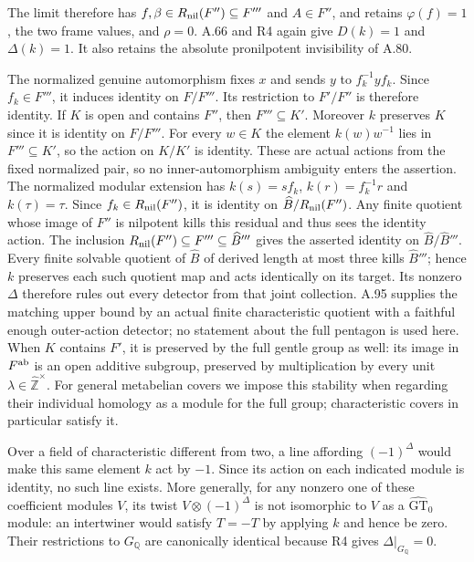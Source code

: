 The limit therefore has $f,\beta\in R_{\rm nil}(F'')\subseteq F'''$
and $A\in F''$, and retains
$\varphi(f)=1$, the two frame values, and $\rho=0$.
A.66 and R4 again give $D(k)=1$ and $\Delta(k)=1$.
It also retains the absolute pronilpotent invisibility of A.80.

The normalized genuine automorphism fixes $x$ and sends
$y$ to $f_k^{-1}yf_k$. Since $f_k\in F'''$, it induces identity
on $F/F'''$. Its restriction to $F'/F''$ is therefore identity.
If $K$ is open and contains $F''$, then $F'''\subseteq K'$.
Moreover $k$ preserves $K$ since it is identity on $F/F'''$.
For every $w\in K$ the element $k(w)w^{-1}$ lies in
$F'''\subseteq K'$, so the action on $K/K'$ is identity.
These are actual actions from the fixed normalized pair, so
no inner-automorphism ambiguity enters the assertion.
The normalized modular extension has
$k(s)=sf_k$, $k(r)=f_k^{-1}r$ and $k(\tau)=\tau$.
Since $f_k\in R_{\rm nil}(F'')$, it is identity on
$\widehat B/R_{\rm nil}(F'')$. Any finite quotient whose
image of $F''$ is nilpotent kills this residual and thus sees
the identity action. The inclusion
$R_{\rm nil}(F'')\subseteq F'''\subseteq\widehat B'''$
gives the asserted identity on $\widehat B/\widehat B'''$.
Every finite solvable quotient
of $\widehat B$ of derived length at most three kills
$\widehat B'''$; hence $k$ preserves each such quotient map
and acts identically on its target. Its nonzero $\Delta$
therefore rules out every detector from that joint collection.
A.95 supplies the matching upper bound by an actual finite
characteristic quotient with a faithful enough outer-action
detector; no statement about the full pentagon is used here.
When $K$ contains $F'$, it is preserved by the full gentle
group as well: its image in $F^{\rm ab}$ is an open additive subgroup,
preserved by multiplication by every unit
$\lambda\in\widehat{\mathbb Z}^{\times}$.
For general metabelian covers we impose this stability when
regarding their individual homology as a module for the full
group; characteristic covers in particular satisfy it.

Over a field of characteristic different from two, a line
affording $(-1)^\Delta$ would make this same element $k$
act by $-1$. Since its action on each indicated module is
identity, no such line exists. More generally, for any nonzero
one of these coefficient modules $V$, its twist
$V\otimes(-1)^\Delta$ is not isomorphic to $V$ as a
$\widehat{\mathrm{GT}}_0$ module: an intertwiner would satisfy
$T=-T$ by applying $k$ and hence be zero. Their restrictions
to $G_{\mathbb Q}$ are canonically identical because R4
gives $\Delta|_{G_{\mathbb Q}}=0$.

